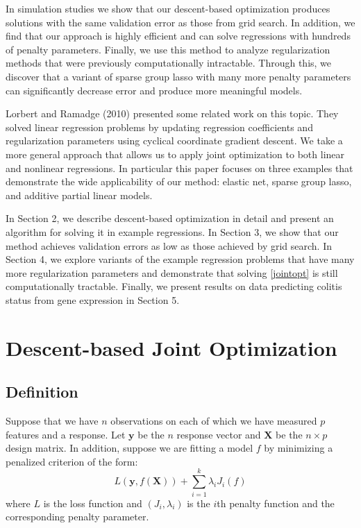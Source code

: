 \documentclass[10pt,letterpaper]{article}
\begin{document}
In simulation studies we show that our descent-based optimization produces solutions with the same validation error as those from grid search. In addition, we find that our approach is highly efficient and can solve regressions with hundreds of penalty parameters. Finally, we use this method to analyze regularization methods that were previously computationally intractable. Through this, we discover that a variant of sparse group lasso with many more penalty parameters can significantly decrease error and produce more meaningful models.

Lorbert and Ramadge (2010) presented some related work on this topic. They solved linear regression problems by updating regression coefficients and regularization parameters using cyclical coordinate gradient descent. We take a more general approach that allows us to apply joint optimization to both linear and nonlinear regressions. In particular this paper focuses on three examples that demonstrate the wide applicability of our method: elastic net, sparse group lasso, and additive partial linear models.

In Section 2, we describe descent-based optimization in detail and present an algorithm for solving it in example regressions. In Section 3, we show that our method achieves validation errors as low as those achieved by grid search. In Section 4, we explore variants of the example regression problems that have many more regularization parameters and demonstrate that solving \eqref{jointopt} is still computationally tractable. Finally, we present results on data predicting colitis status from gene expression in Section 5.

\section{Descent-based Joint Optimization}
\subsection{Definition}
Suppose that we have $n$ observations on each of which we have measured $p$ features and a response. Let $\boldsymbol{y}$ be the $n$ response vector and $\boldsymbol{X}$ be the $n \times p$ design matrix. In addition, suppose we are fitting a model $f$ by minimizing a penalized criterion of the form:
\begin{equation}
L(\boldsymbol{y}, f (\boldsymbol{X})) + \sum\limits_{i=1}^k \lambda_i J_i(f)
\end{equation}
where $L$ is the loss function and $(J_i, \lambda_i)$ is the $i$th penalty function and the corresponding penalty parameter.
\end{document}
